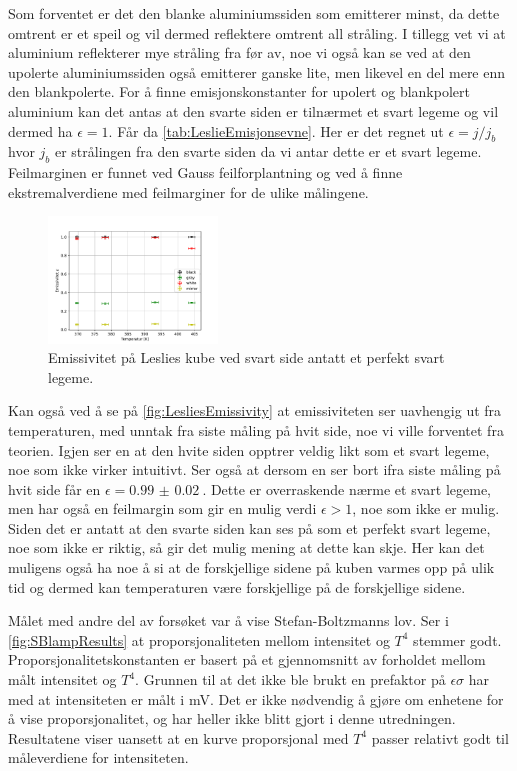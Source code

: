 Som forventet er det den blanke aluminiumssiden som emitterer minst, da dette omtrent er et speil og vil dermed reflektere omtrent all stråling. I tillegg vet vi at aluminium reflekterer mye stråling fra før av, noe vi også kan se ved at den upolerte aluminiumssiden også emitterer ganske lite, men likevel en del mere enn den blankpolerte. For å finne emisjonskonstanter for upolert og blankpolert aluminium kan det antas at den svarte siden er tilnærmet et svart legeme og vil dermed ha $\epsilon = 1$. Får da \autoref{tab:LeslieEmisjonsevne}. Her er det regnet ut $\epsilon = j/j_{b}$ hvor $j_{b}$ er strålingen fra den svarte siden da vi antar dette er et svart legeme. Feilmarginen er funnet ved Gauss feilforplantning og ved å finne ekstremalverdiene med feilmarginer for de ulike målingene.

\begin{figure}
  \centering
  \includegraphics[width=0.4\textwidth]{../code/LC_emissivity.pdf}
  \caption{Emissivitet på Leslies kube ved svart side antatt et perfekt svart legeme.}
  \label{fig:LesliesEmissivity}
\end{figure}

Kan også ved å se på \autoref{fig:LesliesEmissivity} at emissiviteten ser uavhengig ut fra temperaturen, med unntak fra siste måling på hvit side, noe vi ville forventet fra teorien. Igjen ser en at den hvite siden opptrer veldig likt som et svart legeme, noe som ikke virker intuitivt. Ser også at dersom en ser bort ifra siste måling på hvit side får en $\epsilon = \SI{0.99(2)}{}$. Dette er overraskende nærme et svart legeme, men har også en feilmargin som gir en mulig verdi $\epsilon > 1$, noe som ikke er mulig. Siden det er antatt at den svarte siden kan ses på som et perfekt svart legeme, noe som ikke er riktig, så gir det mulig mening at dette kan skje. Her kan det muligens også ha noe å si at de forskjellige sidene på kuben varmes opp på ulik tid og dermed kan temperaturen være forskjellige på de forskjellige sidene.

Målet med andre del av forsøket var å vise Stefan-Boltzmanns lov. Ser i \autoref{fig:SBlampResults} at proporsjonaliteten mellom intensitet og $T^4$ stemmer godt. Proporsjonalitetskonstanten er basert på et gjennomsnitt av forholdet mellom målt intensitet og $T^4$. Grunnen til at det ikke ble brukt en prefaktor på $\epsilon \sigma$ har med at intensiteten er målt i mV. Det er ikke nødvendig å gjøre om enhetene for å vise proporsjonalitet, og har heller ikke blitt gjort i denne utredningen. Resultatene viser uansett at en kurve proporsjonal med $T^4$ passer relativt godt til måleverdiene for intensiteten.

